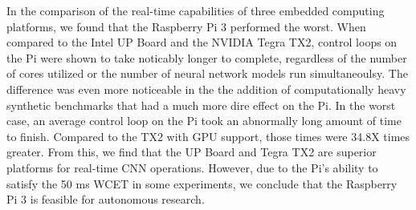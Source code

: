 In the comparison of the real-time capabilities of three embedded 
computing platforms, we found that the Raspberry Pi 3 performed the 
worst. When compared to the Intel UP Board and the NVIDIA Tegra TX2, 
control loops on the Pi were shown to take noticably longer to 
complete, regardless of the number of cores utilized or the number of 
neural network models run simultaneoulsy. The difference was even 
more noticeable in the the addition of computationally heavy 
synthetic benchmarks that had a much more dire effect on the Pi. In 
the worst case, an average control loop on the Pi took an abnormally 
long amount of time to finish. Compared to the TX2 with GPU support, 
those times were 34.8X times greater. From this, we find that the UP 
Board and Tegra TX2 are superior platforms for real-time CNN 
operations. However, due to the Pi's ability to satisfy the 50 ms 
WCET in some experiments, we conclude that the Raspberry Pi 3 is 
feasible for autonomous research.



